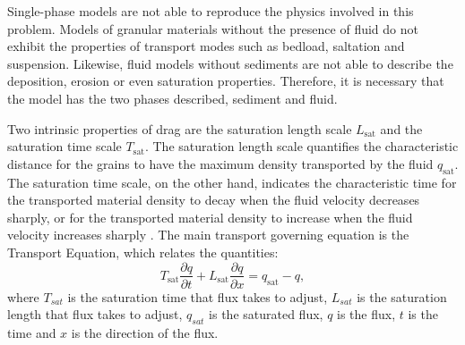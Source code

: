 
    Single-phase models are not able to reproduce the physics involved in this problem. Models of granular materials without the presence of fluid do not exhibit the properties of transport modes such as bedload, saltation and suspension. Likewise, fluid models without sediments are not able to describe the deposition, erosion or even saturation properties. Therefore, it is necessary that the model has the two phases described, sediment and fluid. 


    Two intrinsic properties of drag are the saturation length scale $L_\textrm{sat}$ and the saturation time scale $T_\textrm{sat}$. The saturation length scale quantifies the characteristic distance for the grains to have the maximum density transported by the fluid $q_\textrm{sat}$. The saturation time scale, on the other hand, indicates the characteristic time for the transported material density to decay when the fluid velocity decreases sharply, or for the transported material density to increase when the fluid velocity increases sharply \cite{Granular_Media_Between_Fluid_and_Solid}. The main transport governing equation is the Transport Equation, which relates the quantities:
\begin{equation}
    T_\textrm{sat} \frac{\partial q}{\partial t} + L_\textrm{sat} \frac{\partial q}{\partial x} = q_\textrm{sat} - q,
    \label{equ:transporte}
\end{equation}
where $T_{sat}$ is the saturation time that flux takes to adjust, $L_{sat}$ is the saturation length that flux takes to adjust, $q_{sat}$ is the saturated flux, $q$ is the flux, $t$ is the time and $x$ is the direction of the flux.

